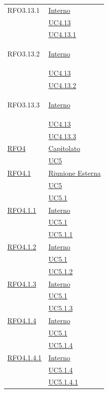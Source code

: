 \begin{longtable}{|>{\centering}m{5cm}|m{5cm}<{\centering}|}
\hypertarget{RFO3.13.1}{RFO3.13.1} & \hyperlink{Interno}{Interno}\\
&\hyperref[UC4.13]{UC4.13}\\
&\hyperref[UC4.13.1]{UC4.13.1}\\ \hline

\hypertarget{RFO3.13.2}{RFO3.13.2} & \hyperlink{Interno}{Interno}\\
&\hyperref[UC4.13]{UC4.13}\\
&\hyperref[UC4.13.2]{UC4.13.2}\\ \hline

\hypertarget{RFO3.13.3}{RFO3.13.3} & \hyperlink{Interno}{Interno}\\
&\hyperref[UC4.13]{UC4.13}\\
&\hyperref[UC4.13.3]{UC4.13.3}\\ \hline

\hyperlink{RFO4}{RFO4} & \hyperlink{Capitolato}{Capitolato}\\
& \hyperref[UC5]{UC5}\\ \hline

\hyperlink{RFO4.1}{RFO4.1} & \hyperlink{Riunione Esterna}{Riunione Esterna}\\
& \hyperref[UC5]{UC5}\\
& \hyperref[UC5.1]{UC5.1}\\ \hline

\hyperlink{RFO4.1.1}{RFO4.1.1} & \hyperlink{Interno}{Interno}\\
& \hyperref[UC5.1]{UC5.1}\\
& \hyperref[UC5.1.1]{UC5.1.1}\\ \hline

\hyperlink{RFO4.1.2}{RFO4.1.2} & \hyperlink{Interno}{Interno}\\
& \hyperref[UC5.1]{UC5.1}\\
& \hyperref[UC5.1.2]{UC5.1.2}\\ \hline

\hyperlink{RFO4.1.3}{RFO4.1.3} & \hyperlink{Interno}{Interno}\\
& \hyperref[UC5.1]{UC5.1}\\
& \hyperref[UC5.1.3]{UC5.1.3}\\ \hline

\hyperlink{RFO4.1.4}{RFO4.1.4} & \hyperlink{Interno}{Interno}\\
& \hyperref[UC5.1]{UC5.1}\\
& \hyperref[UC5.1.4]{UC5.1.4}\\ \hline

\hyperlink{RFO4.1.4.1}{RFO4.1.4.1} & \hyperlink{Interno}{Interno}\\
& \hyperref[UC5.1.4]{UC5.1.4}\\
& \hyperref[UC5.1.4.1]{UC5.1.4.1}\\ \hline


\end{longtable}
